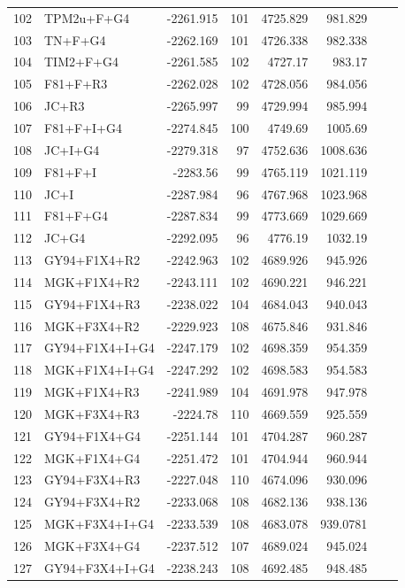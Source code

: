 \documentclass[fleqn,letterpaper]{article}
\begin{document}
\begin{longtable}{clrrrrrr}
	102 & TPM2u+F+G4 & -2261.915 & 101 & 4725.829 & 981.829 \\ 
	103 & TN+F+G4 & -2262.169 & 101 & 4726.338 & 982.338 \\ 
	104 & TIM2+F+G4 & -2261.585 & 102 & 4727.17 & 983.17 \\ 
	105 & F81+F+R3 & -2262.028 & 102 & 4728.056 & 984.056 \\ 
	106 & JC+R3 & -2265.997 & 99 & 4729.994 & 985.994 \\ 
	107 & F81+F+I+G4 & -2274.845 & 100 & 4749.69 & 1005.69 \\ 
	108 & JC+I+G4 & -2279.318 & 97 & 4752.636 & 1008.636 \\ 
	109 & F81+F+I & -2283.56 & 99 & 4765.119 & 1021.119 \\ 
	110 & JC+I & -2287.984 & 96 & 4767.968 & 1023.968 \\ 
	111 & F81+F+G4 & -2287.834 & 99 & 4773.669 & 1029.669 \\ 
	112 & JC+G4 & -2292.095 & 96 & 4776.19 & 1032.19 \\ 
	113 & GY94+F1X4+R2 & -2242.963 & 102 & 4689.926 & 945.926 \\ 
	114 & MGK+F1X4+R2 & -2243.111 & 102 & 4690.221 & 946.221 \\ 
	115 & GY94+F1X4+R3 & -2238.022 & 104 & 4684.043 & 940.043 \\ 
	116 & MGK+F3X4+R2 & -2229.923 & 108 & 4675.846 & 931.846 \\ 
	117 & GY94+F1X4+I+G4 & -2247.179 & 102 & 4698.359 & 954.359 \\ 
	118 & MGK+F1X4+I+G4 & -2247.292 & 102 & 4698.583 & 954.583 \\ 
	119 & MGK+F1X4+R3 & -2241.989 & 104 & 4691.978 & 947.978 \\ 
	120 & MGK+F3X4+R3 & -2224.78 & 110 & 4669.559 & 925.559 \\ 
	121 & GY94+F1X4+G4 & -2251.144 & 101 & 4704.287 & 960.287 \\ 
	122 & MGK+F1X4+G4 & -2251.472 & 101 & 4704.944 & 960.944 \\ 
	123 & GY94+F3X4+R3 & -2227.048 & 110 & 4674.096 & 930.096 \\ 
	124 & GY94+F3X4+R2 & -2233.068 & 108 & 4682.136 & 938.136 \\ 
	125 & MGK+F3X4+I+G4 & -2233.539 & 108 & 4683.078 & 939.0781 \\ 
	126 & MGK+F3X4+G4 & -2237.512 & 107 & 4689.024 & 945.024 \\ 
	127 & GY94+F3X4+I+G4 & -2238.243 & 108 & 4692.485 & 948.485 \\ 

\end{longtable}
\end{document}
